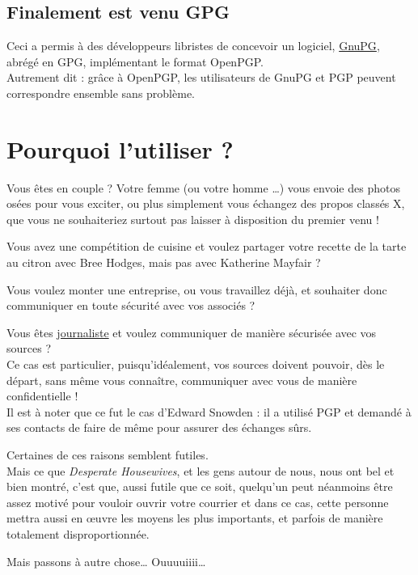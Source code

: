 \subsection{Finalement est venu GPG}\label{finalement-est-venu-gpg}

Ceci a permis à des développeurs libristes de concevoir un logiciel,
\href{https://www.gnupg.org/}{GnuPG}, abrégé en GPG, implémentant le
format OpenPGP.\\Autrement dit : grâce à OpenPGP, les utilisateurs de
GnuPG et PGP peuvent correspondre ensemble sans problème.

\section{Pourquoi l'utiliser ?}\label{pourquoi-lutiliser}

Vous êtes en couple ? Votre femme (ou votre homme \ldots{}) vous envoie
des photos osées pour vous exciter, ou plus simplement vous échangez des
propos classés X, que vous ne souhaiteriez surtout pas laisser à
disposition du premier venu !

Vous avez une compétition de cuisine et voulez partager votre recette de la tarte au citron avec Bree Hodges, mais pas avec Katherine Mayfair ?

Vous voulez monter une entreprise, ou vous travaillez déjà, et souhaiter donc communiquer en toute sécurité avec vos associés ?

Vous êtes \href{\{filename\}../nouveau-journalisme.md}{journaliste} et
voulez communiquer de manière sécurisée avec vos sources ?\\Ce cas est
particulier, puisqu'idéalement, vos sources doivent pouvoir, dès le
départ, sans même vous connaître, communiquer avec vous de manière
confidentielle !\\Il est à noter que ce fut le cas d'Edward Snowden : il
a utilisé PGP et demandé à ses contacts de faire de même pour assurer
des échanges sûrs.

Certaines de ces raisons semblent futiles.\\Mais ce que \emph{Desperate
Housewives}, et les gens autour de nous, nous ont bel et bien montré,
c'est que, aussi futile que ce soit, quelqu'un peut néanmoins être assez
motivé pour vouloir ouvrir votre courrier et dans ce cas, cette personne
mettra aussi en œuvre les moyens les plus importants, et parfois de
manière totalement disproportionnée.

Mais passons à autre chose\ldots{}
Ouuuuiiii\ldots{}\\

